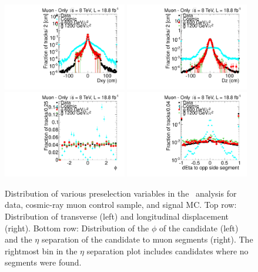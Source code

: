 \begin{figure}
\centering
  \includegraphics[clip=false, trim=0.0cm 0cm 0.0cm 0cm, width=0.48\textwidth]{figures/muonly/Selection_Comp_8TeV_Cosmic_Dxy_BS}
  \includegraphics[clip=false, trim=0.0cm 0cm 0.0cm 0cm, width=0.48\textwidth]{figures/muonly/Selection_Comp_8TeV_Cosmic_Dz_BS} \\
  \includegraphics[clip=false, trim=0.0cm 0cm 0.0cm 0cm, width=0.48\textwidth]{figures/muonly/Selection_Comp_8TeV_Cosmic_Phi_BS}
  \includegraphics[clip=false, trim=0.0cm 0cm 0.0cm 0cm, width=0.48\textwidth]{figures/muonly/Selection_Comp_8TeV_Cosmic_SegMinEtaSep_BS}
  \caption[Distribution of transverse and longitudinal displacement, $\phi$, and $\eta$ separation to muon segments
in the \muononly\ analysis for data, cosmic-ray muon control sample, and signal MC.]
{Distribution of various preselection variables in the \muononly\ analysis for data, cosmic-ray muon control sample, and signal MC.
Top row: Distribution of transverse (left) and longitudinal displacement (right).
Bottom row: Distribution of the $\phi$ of the candidate (left) and the $\eta$ separation of the candidate to muon segments (right). The rightmost bin in the
$\eta$ separation plot includes candidates where no segments were found.}
    \label{fig:MuOnlyPreselC}
\end{figure}


